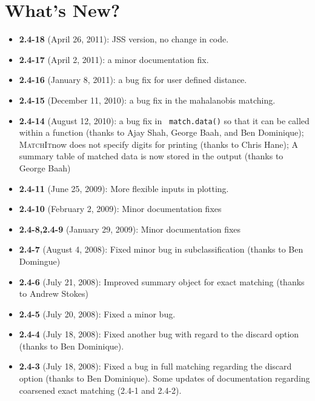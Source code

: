 \documentclass[oneside,letterpaper,12pt]{book}
\newcommand{\MatchIt}{\textsc{MatchIt}}
\begin{document}









\chapter{What's New?}

\begin{itemize}
\item \textbf{2.4-18} (April 26, 2011): JSS version, no change in code.
\item \textbf{2.4-17} (April 2, 2011): a minor documentation fix.
\item \textbf{2.4-16} (January 8, 2011): a bug fix for user defined distance.
\item \textbf{2.4-15} (December 11, 2010): a bug fix in the
  mahalanobis matching.
\item \textbf{2.4-14} (August 12, 2010): a bug fix in {\tt
    match.data()} so that it can be called within a function (thanks
  to Ajay Shah, George Baah, and Ben Dominique); \MatchIt now does not
  specify digits for printing (thanks to Chris Hane); A summary table
  of matched data is now stored in the output (thanks to George Baah)
\item \textbf{2.4-11} (June 25, 2009): More flexible inputs in
  plotting.
\item \textbf{2.4-10} (February 2, 2009): Minor documentation fixes
\item \textbf{2.4-8,2.4-9} (January 29, 2009): Minor documentation fixes
\item \textbf{2.4-7} (August 4, 2008): Fixed minor bug in subclassification 
(thanks to Ben Domingue)
\item \textbf{2.4-6} (July 21, 2008): Improved summary object for
  exact matching (thanks to Andrew Stokes)
\item \textbf{2.4-5} (July 20, 2008): Fixed a minor bug.
\item \textbf{2.4-4} (July 18, 2008): Fixed another bug with regard to the discard option (thanks to Ben Dominique).
\item \textbf{2.4-3} (July 18, 2008): Fixed a bug in full matching
  regarding the discard option (thanks to Ben Dominique). Some updates
  of documentation regarding coarsened exact matching (2.4-1 and
  2.4-2).

\end{itemize}
\end{document}
